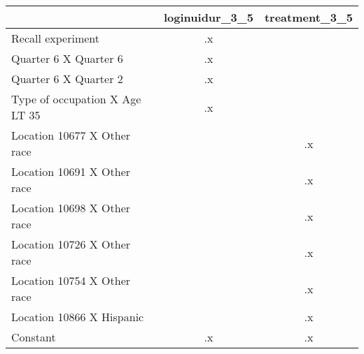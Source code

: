 \begin{tabular}{l*{2}{c}}
\hline\hline
                    &loginuidur\_3\_5&treatment\_3\_5\\
\hline
Recall experiment   &          .x&            \\
Quarter 6 X Quarter 6&          .x&            \\
Quarter 6 X Quarter 2&          .x&            \\
Type of occupation X Age LT 35&          .x&            \\
Location 10677 X Other race&            &          .x\\
Location 10691 X Other race&            &          .x\\
Location 10698 X Other race&            &          .x\\
Location 10726 X Other race&            &          .x\\
Location 10754 X Other race&            &          .x\\
Location 10866 X Hispanic&            &          .x\\
Constant            &          .x&          .x\\
\hline\hline
\end{tabular}
